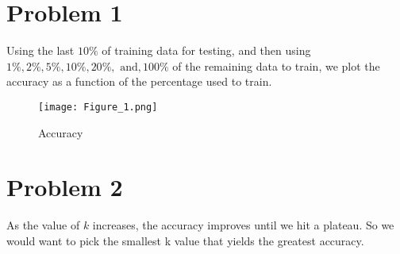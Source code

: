 
\subsectionfont{\fontsize{10}{10}\selectfont}

\graphicspath{ {/home/computer/ucsc/master-2/quarter-1/machine-learning/assignment_03/figures/} }

\section{Problem 1}

Using the last $10\%$ of training data for testing, and then using $1\%, 2\%,
5\%, 10\%, 20\%, \text{ and}, 100\%$ of the remaining data to train, we plot
the accuracy as a function of the percentage used to train.

\begin{figure}[H]
  \centering
  \texttt{[image: Figure\_1.png]}
  \caption{Accuracy}%
  \label{fig:name}
\end{figure}

\section{Problem 2}
As the value of $k$ increases, the accuracy improves until we hit a plateau. So
we would want to pick the smallest k value that yields the greatest accuracy.
